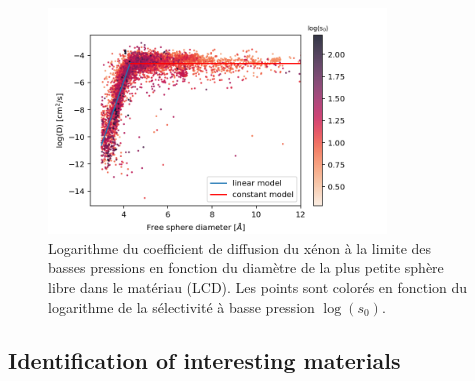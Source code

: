 \documentclass[main]{subfiles}
\begin{document}
\begin{figure}[t]
\centering
  \includegraphics[width=0.8\textwidth]{figures/5-diffusion/D_log-diameter_colored_s_models+.png}
  \caption{Logarithme du coefficient de diffusion du xénon à la limite des basses pressions en fonction du diamètre de la plus petite sphère libre dans le matériau (LCD). Les points sont colorés en fonction du logarithme de la sélectivité à basse pression $\log(s_0)$.}\label{fgr:Diff_Df_s}
\end{figure}


\subsection{Identification of interesting materials}


\end{document}
